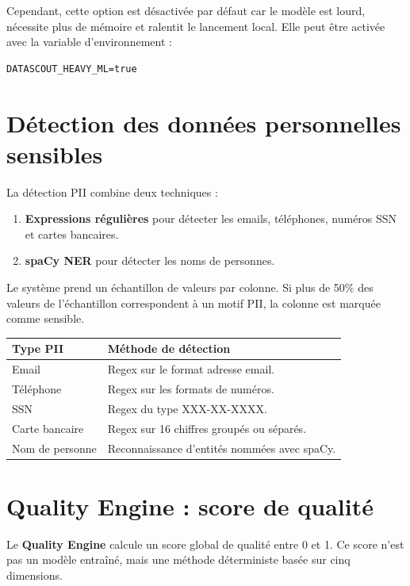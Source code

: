 \documentclass[12pt,a4paper]{report}
\begin{document}
Cependant, cette option est désactivée par défaut car le modèle est lourd, nécessite plus de mémoire et ralentit le lancement local. Elle peut être activée avec la variable d'environnement :

\begin{verbatim}
DATASCOUT_HEAVY_ML=true
\end{verbatim}

\section{Détection des données personnelles sensibles}

La détection PII combine deux techniques :

\begin{enumerate}
    \item \textbf{Expressions régulières} pour détecter les emails, téléphones, numéros SSN et cartes bancaires.
    \item \textbf{spaCy NER} pour détecter les noms de personnes.
\end{enumerate}

Le système prend un échantillon de valeurs par colonne. Si plus de 50\% des valeurs de l'échantillon correspondent à un motif PII, la colonne est marquée comme sensible.

\begin{longtable}{p{4cm}p{9cm}}
\toprule
\textbf{Type PII} & \textbf{Méthode de détection} \\
\midrule
Email & Regex sur le format adresse email. \\
Téléphone & Regex sur les formats de numéros. \\
SSN & Regex du type XXX-XX-XXXX. \\
Carte bancaire & Regex sur 16 chiffres groupés ou séparés. \\
Nom de personne & Reconnaissance d'entités nommées avec spaCy. \\
\bottomrule
\end{longtable}

\section{Quality Engine : score de qualité}

Le \textbf{Quality Engine} calcule un score global de qualité entre 0 et 1. Ce score n'est pas un modèle entraîné, mais une méthode déterministe basée sur cinq dimensions.
\end{document}
